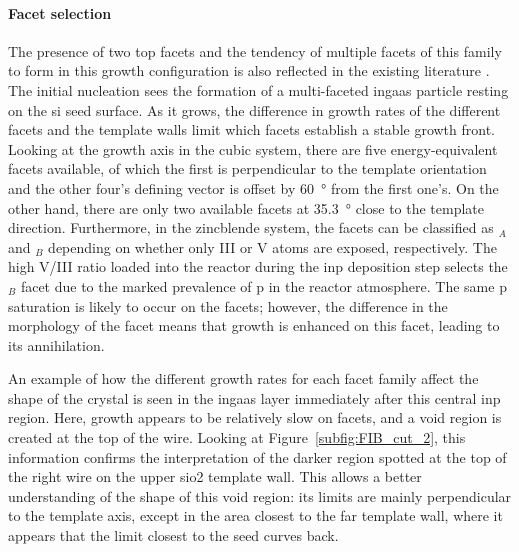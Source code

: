 \paragraph{Facet selection} The presence of two top  facets and the tendency of multiple facets of this family to form in this growth configuration is also reflected in the existing literature \cite{Schmid2015, Knoedler2017, Borg2015, Borg2014}. The initial nucleation sees the formation of a multi-faceted \acs{ingaas} particle resting on the \acl{si} seed surface. As it grows, the difference in growth rates of the different facets and the template walls limit which facets establish a stable growth front. Looking at the \hkl[1 1 0] growth axis in the cubic system, there are five energy-equivalent  facets available, of which the first is perpendicular to the template orientation and the other four's defining vector is offset by \qty{60}{\degree} from the first one's. On the other hand, there are only two available  facets at \qty{35.3}{\degree} close to the template direction. Furthermore, in the zincblende system, the  facets can be classified as \(_A\) and \(_B\) depending on whether only III or V atoms are exposed, respectively. The high V/III ratio loaded into the reactor during the \acs{inp} deposition step selects the \(_B\) facet due to the marked prevalence of \acl{p} in the reactor atmosphere. The same \acl{p} saturation is likely to occur on the  facets; however, the difference in the morphology of the facet means that growth is enhanced on this facet, leading to its annihilation.

An example of how the different growth rates for each facet family affect the shape of the crystal is seen in the \acs{ingaas} layer immediately after this central \acs{inp} region. Here, growth appears to be relatively slow on  facets, and a void region is created at the top of the wire. Looking at Figure~\ref{subfig:FIB_cut_2}, this information confirms the interpretation of the darker region spotted at the top of the right wire on the upper \acs{sio2} template wall. This allows a better understanding of the shape of this void region: its limits are mainly perpendicular to the template axis, except in the area closest to the far template wall, where it appears that the limit closest to the seed curves back.
\par

